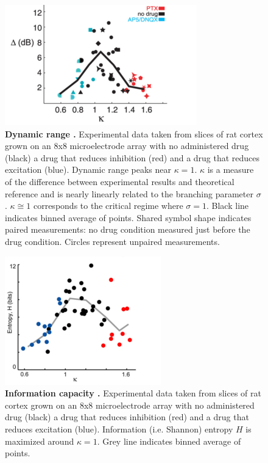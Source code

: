 \documentclass[12pt]{article}
\begin{document}
\begin{figure}      
  \begin{center}    
 \includegraphics[width=.6\textwidth]{dynamicrangeexpplenz}    
    \caption{\textbf{Dynamic range \cite{Shew2009b}.} Experimental data taken from slices of rat cortex grown on an 8x8 microelectrode array with no administered drug (black) a drug that reduces inhibition (red) and a drug that reduces excitation (blue). Dynamic range peaks near $\kappa = 1$. $\kappa$ is a measure of the difference between experimental results and theoretical reference and is nearly linearly related to the branching parameter $\sigma$. $\kappa \cong 1$ corresponds to the critical regime where $\sigma = 1$. Black line indicates binned average of points. Shared symbol shape indicates paired measurements: no drug condition measured just before the drug condition. Circles represent unpaired measurements.}
    
   \label{Figure::Dynamic Range Experiment}   
  \end{center}     
   \end{figure}
  
\begin{figure}      
  \begin{center}    
 \includegraphics[width=.50\textwidth]{entropyplenz}    
    \caption{\textbf{Information capacity \cite{Shew2011a}.} Experimental data taken from slices of rat cortex grown on an 8x8 microelectrode array with no administered drug (black) a drug that reduces inhibition (red) and a drug that reduces excitation (blue). Information (i.e. Shannon) entropy $H$ is maximized around $\kappa = 1$. Grey line indicates binned average of points.}
   \label{Figure::Entropy / information maximized experimental}   
  \end{center}     
   \end{figure}
\end{document}
